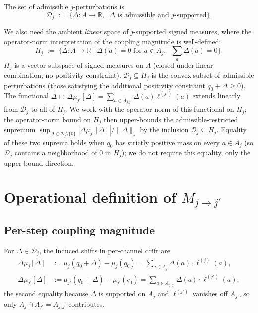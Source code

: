 \documentclass{article}
\begin{document}
The set of admissible $j$-perturbations is
\begin{equation}
  \mathcal{D}_j \;:=\; \{\Delta : A \to \mathbb{R}, \;\;\Delta
  \text{ is admissible and $j$-supported}\}.
\end{equation}

We also need the ambient \emph{linear} space of $j$-supported
signed measures, where the operator-norm interpretation of the
coupling magnitude is well-defined:
\begin{equation}
\label{eq:Hj-def}
  H_j \;:=\; \{\Delta : A \to \mathbb{R} \mid \Delta(a) = 0
  \text{ for } a \notin A_j, \;\; \textstyle\sum_a \Delta(a) = 0\}.
\end{equation}
$H_j$ is a vector subspace of signed measures on $A$ (closed under
linear combination, no positivity constraint).
$\mathcal{D}_j \subseteq H_j$ is the convex subset of admissible
perturbations (those satisfying the additional positivity
constraint $q_0 + \Delta \geq 0$).  The functional
$\Delta \mapsto \Delta\mu_{j'}[\Delta] = \sum_{a \in A_{j,j'}}
\Delta(a) \ell^{(j')}(a)$ extends linearly from $\mathcal{D}_j$ to
all of $H_j$.  We work with the operator norm of this functional
on $H_j$; the operator-norm bound on $H_j$ then upper-bounds the
admissible-restricted supremum
$\sup_{\Delta \in \mathcal{D}_j \setminus \{0\}}
|\Delta\mu_{j'}[\Delta]|/\|\Delta\|_1$ by the inclusion
$\mathcal{D}_j \subseteq H_j$.  Equality of these two suprema
holds when $q_0$ has strictly positive mass on every $a \in A_j$
(so $\mathcal{D}_j$ contains a neighborhood of $0$ in $H_j$); we
do not require this equality, only the upper-bound direction.

\section{Operational definition of \texorpdfstring{$M_{j \to j'}$}{M\_jj'}}

\subsection{Per-step coupling magnitude}

For $\Delta \in \mathcal{D}_j$, the induced shifts in per-channel
drift are
\begin{align}
  \Delta\mu_j[\Delta] &:= \mu_j(q_0 + \Delta) - \mu_j(q_0)
    = \sum_{a \in A_j} \Delta(a) \cdot \ell^{(j)}(a), \\
  \Delta\mu_{j'}[\Delta] &:= \mu_{j'}(q_0 + \Delta) - \mu_{j'}(q_0)
    = \sum_{a \in A_{j, j'}} \Delta(a) \cdot \ell^{(j')}(a),
\end{align}
the second equality because $\Delta$ is supported on $A_j$ and
$\ell^{(j')}$ vanishes off $A_{j'}$, so only $A_j \cap A_{j'} =
A_{j,j'}$ contributes.
\end{document}
